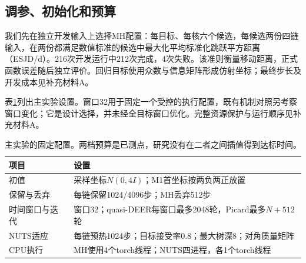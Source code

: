 \documentclass[UTF8,fontset=fandol,zihao=-4]{ctexart}
\begin{document}
\subsection{调参、初始化和预算}
我们先在独立开发输入上选择MH配置：每目标、每核六个候选，每候选两份四链输入，在两份都满足数值标准的候选中最大化平均标准化跳跃平方距离（ESJD/d）。216次开发运行中212次完成，4次失败。该准则衡量移动距离，正式函数误差随后独立评价。回归目标使用众数与信息矩阵形成仿射坐标；最终步长及开发成本见补充材料A。

表\ref{tab:settings}列出主实验设置。窗口32用于固定一个受控的执行配置，既有机制对照另考察窗口变化；它是设计选择，并未经全目标窗口优化。完整资源保护与运行顺序见补充材料A。
\begin{table}[htbp]\centering\small
\begin{tabular}{lp{.65\linewidth}}\toprule
项目 & 设置\\\midrule
初值 & 采样坐标$N(0,4I)$；M1首坐标按两负两正放置\\
保留与丢弃 & 每链保留1024/4096步；MH丢弃512步\\
时间窗口与迭代 & 窗口32；quasi-DEER每窗口最多2048轮，Picard最多$N+512$轮\\
NUTS适应 & 每链预热1024步；目标接受率0.8；最大树深8；对角质量矩阵\\
CPU执行 & MH使用4个torch线程；NUTS四进程，各1个torch线程\\\bottomrule
\end{tabular}
\caption{主实验的固定配置。两档预算是已测点，研究没有在二者之间插值得到达标时间。}\label{tab:settings}
\end{table}
\end{document}
